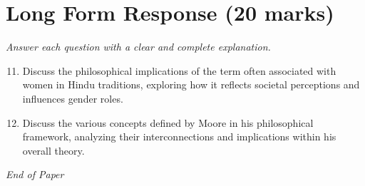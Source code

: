 \documentclass[12pt]{article}
\begin{document}
\section*{Long Form Response (20 marks)}
\textit{Answer each question with a clear and complete explanation.}
\begin{enumerate}[label=\arabic*.]
\setcounter{enumi}{10}
\item Discuss the philosophical implications of the term often associated with women in Hindu traditions, exploring how it reflects societal perceptions and influences gender roles.
\item Discuss the various concepts defined by Moore in his philosophical framework, analyzing their interconnections and implications within his overall theory.
\end{enumerate}

\vfill
\noindent\textit{End of Paper}
\end{document}

